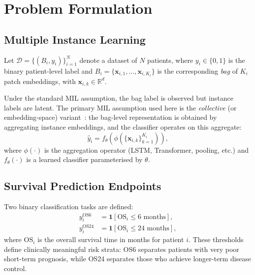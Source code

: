 \documentclass[11pt,a4paper]{article}
\begin{document}
\section{Problem Formulation}
\label{sec:problem}

\subsection{Multiple Instance Learning}

Let $\mathcal{D} = \{(B_i, y_i)\}_{i=1}^{N}$ denote a dataset of $N$ patients,
where $y_i \in \{0, 1\}$ is the binary patient-level label and
$B_i = \{\mathbf{x}_{i,1}, \ldots, \mathbf{x}_{i,K_i}\}$ is the corresponding
\emph{bag} of $K_i$ patch embeddings, with
$\mathbf{x}_{i,k} \in \mathbb{R}^{d}$.

Under the standard MIL assumption, the bag label is observed but instance
labels are latent. The primary MIL assumption used here is the \emph{collective}
(or embedding-space) variant~\cite{carbonneau2018}: the bag-level representation
is obtained by aggregating instance embeddings, and the classifier operates on this
aggregate:
\begin{equation}
  \hat{y}_i = f_\theta\!\left(\phi\!\left(\{\mathbf{x}_{i,k}\}_{k=1}^{K_i}\right)\right),
\end{equation}
where $\phi(\cdot)$ is the aggregation operator (LSTM, Transformer, pooling, etc.)
and $f_\theta(\cdot)$ is a learned classifier parameterised by $\theta$.

\subsection{Survival Prediction Endpoints}

Two binary classification tasks are defined:
\begin{align}
  y^{\text{OS6}}_i  &= \mathbf{1}[\text{OS}_i \leq 6  \text{ months}], \\
  y^{\text{OS24}}_i &= \mathbf{1}[\text{OS}_i \leq 24 \text{ months}],
\end{align}
where $\text{OS}_i$ is the overall survival time in months for patient $i$.
These thresholds define clinically meaningful risk strata: OS6 separates patients
with very poor short-term prognosis, while OS24 separates those who achieve
longer-term disease control.

\end{document}
